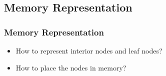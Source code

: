 \documentclass{beamer}
\newcommand{\drawSplit}[2]{
  \draw[dashed,line width=0.75pt] (#1) -- (#2);
}
\begin{document}

\subsection{Memory Representation}
\begin{frame}
  \frametitle{Memory Representation}
  \begin{itemize}
  \item How to represent interior nodes and leaf nodes?
  \item How to place the nodes in memory?
  \end{itemize}
\end{frame}
\end{document}
